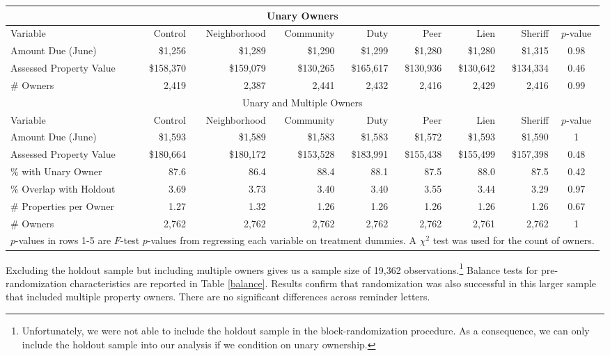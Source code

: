 \documentclass[12pt]{article}
\begin{document}
\begin{sidewaystable}[htbp]
\centering
\caption{Balance on Observables}\label{balance}
\bigskip
\begin{tabular}{lrrrrrrrc}
\hline
\multicolumn{9}{c}{Unary Owners} \\
\hline
Variable & Control & Neighborhood & Community & Duty & Peer & Lien & Sheriff & $p$-value \\ 
\hline
Amount Due (June) & \$1,256 & \$1,289 & \$1,290 & \$1,299 & \$1,280 & \$1,280 & \$1,315 & 0.98 \\ 
Assessed Property Value & \$158,370 & \$159,079 & \$130,265 & \$165,617 & \$130,936 & \$130,642 &
 \$134,334 & 0.46 \\ 
\# Owners & 2,419 & 2,387 & 2,441 & 2,432 & 2,416 & 2,429 & 2,416 & 0.99 \\ 
\hline
\multicolumn{9}{c}{Unary and Multiple Owners} \\
\hline
Variable & Control & Neighborhood & Community & Duty & Peer & Lien & Sheriff & $p$-value \\ 
\hline
Amount Due (June) & \$1,593 & \$1,589 & \$1,583 & \$1,583 & \$1,572 & \$1,593 & \$1,590 & 1 \\ 
Assessed Property Value & \$180,664 & \$180,172 & \$153,528 & \$183,991 & \$155,438 & \$155,499 & \$157,398 & 0.48 \\ 
\% with Unary Owner & 87.6 & 86.4 & 88.4 & 88.1 & 87.5 & 88.0 & 87.5 & 0.42 \\ 
\% Overlap with Holdout & 3.69 & 3.73 & 3.40 & 3.40 & 3.55 & 3.44 & 3.29 & 0.97 \\ 
\# Properties per Owner & 1.27 & 1.32 & 1.26 & 1.26 & 1.26 & 1.26 & 1.26 & 0.67 \\ 
\# Owners & 2,762 & 2,762 & 2,762 & 2,762 & 2,762 & 2,761 & 2,762 & 1 \\ 
\hline
\multicolumn{9}{l}{\scriptsize{$p$-values in rows 1-5 are $F$-test
    $p$-values from regressing each variable on treatment dummies. A
    $\chi^2$ test was used for the count of owners.}} \\
\end{tabular}
\end{sidewaystable}

Excluding the holdout sample but including multiple owners gives us
a sample size of 19,362 observations.\footnote{Unfortunately, we were
  not able to include the holdout sample in the block-randomization
  procedure. As a consequence, we can only include the holdout sample
  into our analysis if we condition on unary ownership.} Balance
tests for pre-randomization characteristics are reported in Table
\ref{balance}.  Results confirm that randomization was also successful
in this larger sample that included multiple property owners.  There
are no significant differences across reminder letters.
\end{document}
